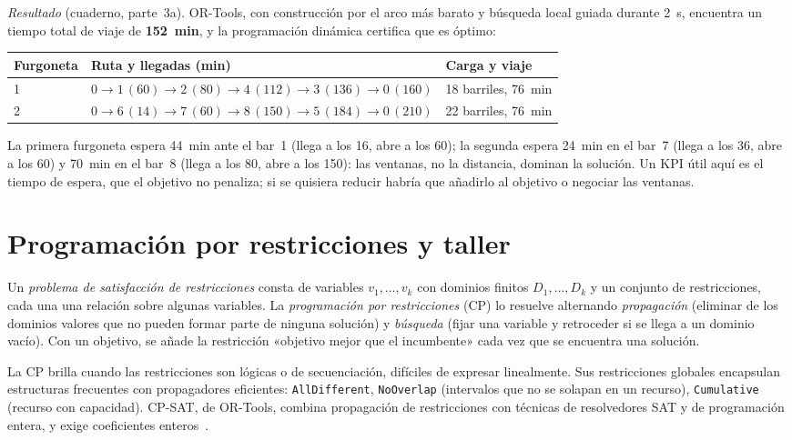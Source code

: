 \begin{ejemplo}
\emph{Resultado} (cuaderno, parte~3a). OR-Tools, con construcción por el arco más barato y búsqueda local guiada durante 2~s, encuentra un tiempo total de viaje de \textbf{152~min}, y la programación dinámica certifica que es óptimo:
\begin{center}\small
\begin{tabular}{@{}lll@{}}
\toprule
Furgoneta & Ruta y llegadas (min) & Carga y viaje \\
\midrule
1 & $0\to 1\,(60)\to 2\,(80)\to 4\,(112)\to 3\,(136)\to 0\,(160)$ & 18 barriles, 76~min \\
2 & $0\to 6\,(14)\to 7\,(60)\to 8\,(150)\to 5\,(184)\to 0\,(210)$ & 22 barriles, 76~min \\
\bottomrule
\end{tabular}
\end{center}
La primera furgoneta espera 44~min ante el bar~1 (llega a los 16, abre a los 60); la segunda espera 24~min en el bar~7 (llega a los 36, abre a los 60) y 70~min en el bar~8 (llega a los 80, abre a los 150): las ventanas, no la distancia, dominan la solución. Un KPI útil aquí es el tiempo de espera, que el objetivo no penaliza; si se quisiera reducir habría que añadirlo al objetivo o negociar las ventanas.
\end{ejemplo}

\section{Programación por restricciones y taller}

\begin{definicion}\label{def:csp}
Un \emph{problema de satisfacción de restricciones} consta de variables $v_1,\dots,v_k$ con dominios finitos $D_1,\dots,D_k$ y un conjunto de restricciones, cada una una relación sobre algunas variables. La \emph{programación por restricciones} (CP) lo resuelve alternando \emph{propagación} (eliminar de los dominios valores que no pueden formar parte de ninguna solución) y \emph{búsqueda} (fijar una variable y retroceder si se llega a un dominio vacío). Con un objetivo, se añade la restricción «objetivo mejor que el incumbente» cada vez que se encuentra una solución.
\end{definicion}

La CP brilla cuando las restricciones son lógicas o de secuenciación, difíciles de expresar linealmente. Sus restricciones globales encapsulan estructuras frecuentes con propagadores eficientes: \texttt{AllDifferent}, \texttt{NoOverlap} (intervalos que no se solapan en un recurso), \texttt{Cumulative} (recurso con capacidad). CP-SAT, de OR-Tools, combina propagación de restricciones con técnicas de resolvedores SAT y de programación entera, y exige coeficientes enteros~\cite{ortools-cpsat}.

